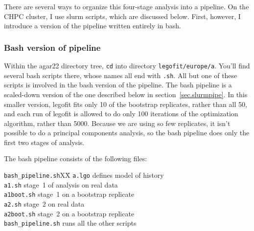 \documentclass[11pt]{article}
\newenvironment{leftindent}%
{\begin{list}{}%
         {\setlength{\leftmargin}{2em}}%
         \item[]%
}{\end{list}}
\begin{document}
There are several ways to organize this four-stage analysis into a
pipeline. On the CHPC cluster, I use slurm scripts, which are
discussed below. First, however, I introduce a version of the pipeline
written entirely in bash.

\subsubsection{Bash version of pipeline}
\label{sec.bashpipe}
Within the agar22 directory tree, \texttt{cd} into directory
\texttt{legofit/europe/a}. You'll find several bash scripts there,
whose names all end with \texttt{.sh}. All but one of these scripts is
involved in the bash version of the pipeline. The bash pipeline is a
scaled-down version of the one described below in
section~\ref{sec.slurmpipe}. In this smaller version, legofit fits
only 10 of the bootstrap replicates, rather than all 50, and each run
of legofit is allowed to do only 100 iterations of the optimization
algorithm, rather than 5000. Because we are using so few replicates,
it isn't possible to do a principal components analysis, so the bash
pipeline does only the first two stages of analysis.

The bash pipeline consists of the following files:
\begin{leftindent}
\begin{tabbing}
\verb|bash_pipeline.sh|XX\=\kill
\texttt{a.lgo} \> defines model of history\\    
\texttt{a1.sh} \> stage~1 of analysis on real data\\
\texttt{a1boot.sh} \> stage~1 on a bootstrap replicate\\
\texttt{a2.sh} \> stage~2 on real data\\
\texttt{a2boot.sh} \> stage~2 on a bootstrap replicate\\
\verb|bash_pipeline.sh| \> runs all the other scripts
\end{tabbing}
\end{leftindent}
\end{document}
